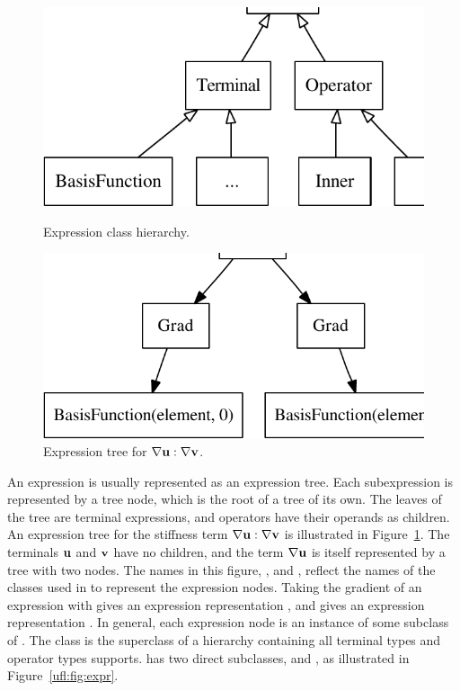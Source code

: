 \begin{figure}[t]
\begin{minipage}[b]{0.47\linewidth}
\centering
\includegraphics[width=1.0\largefig]{chapters/alnes-1/pdf/expr.pdf}
\caption{Expression class hierarchy.}
\label{ufl:fig:expr}
\end{minipage}
\hspace{0.73cm}
\begin{minipage}[b]{0.49\linewidth}
\centering
\includegraphics[width=\largefig]{chapters/alnes-1/pdf/stiffness.pdf}
\caption{Expression tree for $\nabla \mathbf{u} : \nabla \mathbf{v}$.}
\label{ufl:fig:stiffness}
\end{minipage}
\end{figure}
An expression is usually represented as an expression tree.  Each
subexpression is represented by a tree node, which is the root of a
tree of its own.  The leaves of the tree are terminal expressions, and
operators have their operands as children.  An expression tree for the
stiffness term $\nabla\mathbf{u} :\nabla\mathbf{v}$ is illustrated in
Figure~\ref{ufl:fig:stiffness}.  The terminals $\mathbf{u}$ and $\mathbf{v}$ have no
children, and the term $\nabla\mathbf{u}$ is itself represented by a tree
with two nodes.  The names in this figure, , 
and , reflect the names of the classes used in
\ufl{} to represent the expression nodes. Taking the gradient of an
expression with  gives an expression representation
, and  gives an expression
representation .  In general, each expression node
is an instance of some subclass of .  The class
 is the superclass of a hierarchy containing all terminal
types and operator types \ufl{} supports.  has two direct
subclasses,  and , as illustrated in
Figure~\ref{ufl:fig:expr}.

